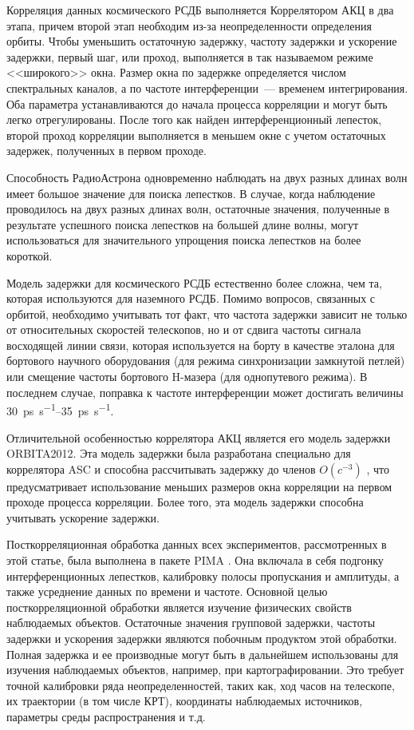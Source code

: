 Корреляция данных космического РСДБ выполняется Коррелятором АКЦ в два этапа, причем второй этап
необходим из-за неопределенности определения орбиты. Чтобы уменьшить остаточную задержку, частоту
задержки и ускорение задержки, первый шаг, или проход, выполняется в так называемом режиме
<<широкого>> окна. Размер окна по задержке определяется числом спектральных каналов, а по частоте
интерференции~--- временем интегрирования. Оба параметра устанавливаются до начала процесса
корреляции и могут быть легко отрегулированы. После того как найден интерференционный лепесток,
второй проход корреляции выполняется в меньшем окне с учетом остаточных задержек, полученных в
первом проходе.

Способность РадиоАстрона одновременно наблюдать на двух разных длинах волн имеет большое значение
для поиска лепестков. В случае, когда наблюдение проводилось на двух разных длинах волн, остаточные
значения, полученные в результате успешного поиска лепестков на большей длине волны, могут
использоваться для значительного упрощения поиска лепестков на более короткой.

Модель задержки для космического РСДБ естественно более сложна, чем та, которая используются для
наземного РСДБ. Помимо вопросов, связанных с орбитой, необходимо учитывать тот факт, что частота
задержки зависит не только от относительных скоростей телескопов, но и от сдвига частоты сигнала
восходящей линии связи, которая используется на борту в качестве эталона для бортового научного
оборудования (для режима синхронизации замкнутой петлей) или смещение частоты
бортового H-мазера (для однопутевого режима). В последнем случае, поправка к частоте интерференции
может достигать величины \SIrange{30}{35}{\pico\second\per\second}.

Отличительной особенностью коррелятора АКЦ является его модель задержки ORBITA2012. Эта модель
задержки была разработана специально для коррелятора ASC и способна рассчитывать задержку до членов
$O(c^{-3})$ \cite{Vlasov_2012}, что предусматривает использование меньших размеров окна корреляции
на первом проходе процесса корреляции. Более того, эта модель задержки способна учитывать ускорение
задержки.

Посткорреляционная обработка данных всех экспериментов, рассмотренных в этой статье, была
выполнена в пакете PIMA \cite{Petrov_2011}. Она включала в себя подгонку интерференционных
лепестков, калибровку полосы пропускания и амплитуды, а также усреднение данных по времени и
частоте. Основной целью посткорреляционной обработки является изучение физических свойств
наблюдаемых объектов. Остаточные значения групповой задержки, частоты задержки и ускорения задержки
являются побочным продуктом этой обработки. Полная задержка и ее производные могут быть
в дальнейшем использованы для изучения наблюдаемых объектов, например, при картографировании.
Это требует точной калибровки ряда неопределенностей, таких как, ход часов на телескопе, их
траектории (в том числе КРТ), координаты наблюдаемых источников, параметры среды распространения и
т.д.

